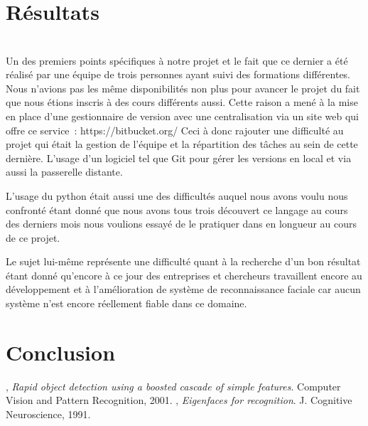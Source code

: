 \documentclass[a4paper,10pt,twocolumn]{extarticle}
\begin{document}
\section{Résultats}

\section{}
Un des premiers points spécifiques à notre projet et le fait que ce dernier a été réalisé par une équipe de trois personnes ayant suivi des formations différentes. Nous n'avions pas les même disponibilités non plus pour avancer le projet du fait que nous étions inscris à des cours différents aussi. Cette raison a mené à la mise en place d'une gestionnaire de version avec une centralisation via un site web qui offre ce service : https://bitbucket.org/
Ceci à donc rajouter une difficulté au projet qui était la gestion de l'équipe et la répartition des tâches au sein de cette dernière. L'usage d'un logiciel tel que Git pour gérer les versions en local et via aussi la passerelle distante.

L'usage du python était aussi une des difficultés auquel nous avons voulu nous confronté étant donné que nous avons tous trois découvert ce langage au cours des derniers mois nous voulions essayé de le pratiquer dans en longueur au cours de ce projet.

Le sujet lui-même représente une difficulté quant à la recherche d'un bon résultat étant donné qu'encore à ce jour des entreprises et chercheurs travaillent encore au développement et à l'amélioration de système de reconnaissance faciale car aucun système n'est encore réellement fiable dans ce domaine.

\section{Conclusion}


\begin{thebibliography}{9}
  , 
  \emph{Rapid object detection using a boosted cascade of simple features}.
  Computer Vision and Pattern Recognition,
  2001.
  , 
  \emph{Eigenfaces for recognition}.
  J. Cognitive Neuroscience,
  1991.  
  

\end{thebibliography}
\end{document}
